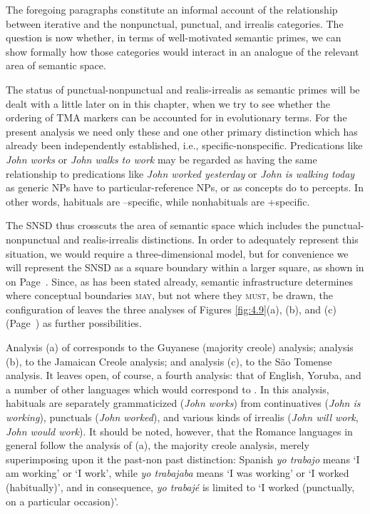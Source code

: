 The foregoing paragraphs constitute an informal account of the relationship between iterative and the nonpunctual, punctual, and irrealis categories. The question is now whether, in terms of well-motivated semantic primes, we can show formally how those categories would interact in an analogue of the relevant area of semantic space.

The status of punctual-nonpunctual and realis-irrealis as semantic primes will be dealt with a little later on in this chapter, when we try to see whether the ordering of TMA markers can be accounted for in evolutionary terms. For the present analysis we need only these and one other primary distinction which has already been independently established, i.e., specific-nonspecific. Predications like  \textit{John works} or
\textit{John walks to work} may be regarded as having the same relationship to predications like \textit{John worked yesterday} or \textit{John is walking today} as generic NPs have to particular-reference NPs, or as concepts do to percepts. In other words, habituals are --specific, while nonhabituals are +specific.

The SNSD thus crosscuts the area of semantic space which includes the punctual-nonpunctual and realis-irrealis distinctions. In order to adequately represent this situation, we would require a three-dimensional model, but for convenience we will represent the SNSD as a square boundary within a larger square, as shown in  on Page~\pageref{fig:4.8}. Since, as has been stated already, semantic infrastructure determines where conceptual boundaries \textsc{may}, but not where they \textsc{must}, be drawn, the configuration of  leaves the three analyses of Figures \ref{fig:4.9}(a), (b), and (c) (Page~\pageref{fig:4.9}) as further possibilities.

Analysis (a) of  corresponds to the Guyanese (majority creole) analysis; analysis (b), to the Jamaican Creole analysis; and analysis (c), to the S{\~a}o Tomense analysis. It leaves open, of course, a fourth analysis: that of English, Yoruba, and a number of other languages which would correspond to . In this analysis, habituals are separately grammaticized (\textit{John works}) from continuatives (\textit{John is working}), punctuals (\textit{John worked}), and various kinds of irrealis (\textit{John will work}, \textit{John would work}). It should be noted, however, that the Romance languages in general follow the analysis of (a), the majority creole analysis, merely superimposing upon it the past-non past distinction: Spanish \textit{yo  trabajo} means `I am working' or `I work', while \textit{yo trabajaba} means `I was working' or `I worked (habitually)', and in consequence, \textit{yo trabajé} is limited to `I worked (punctually, on a particular occasion)'.\\\\


